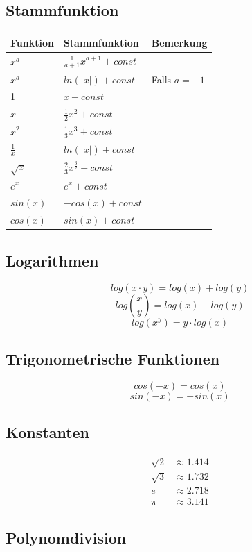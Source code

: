 \subsection{Stammfunktion}
\begin{tabu} to \linewidth {|X|X|X|}
	\hline
	Funktion 	& Stammfunktion & Bemerkung \\ 
	\hline\hline
	$x^a$ & $\frac{1}{a+1}x^{a+1} + const$ & \\ \hline
	$x^a$ & $ln(|x|) + const$ & Falls $a=-1$ \\  & $x + const$ & \\ \hline
	$x$ & $\frac{1}{2}x^2 + const$ & \\ \hline
	$x^2$ & $\frac{1}{3}x^3 + const$ & \\ \hline
	$\frac{1}{x}$ & $ln(|x|) + const$ & \\ \hline
	$\sqrt{x}$ & $\frac{2}{3}x^{\frac{3}{2}}+const$ & \\ \hline
	$e^x$ & $e^x + const$ & \\ \hline
	$sin(x)$ & $-cos(x) + const$ & \\ \hline
	$cos(x)$ & $sin(x) + const$ & \\ \hline
\end{tabu}

\subsection{Logarithmen}
\[
	log(x \cdot y) = log(x) + log(y)
\]
\[
	log(\frac{x}{y}) = log(x) - log(y)
\]
\[
	log(x^y) = y \cdot log(x)
\]

\subsection{Trigonometrische Funktionen}
\[
	cos(-x) = cos(x)
\]
\[
	sin(-x) = -sin(x)
\]

\subsection{Konstanten}
\begin{align*}
	\sqrt{2} &\approx 1.414 \\
	\sqrt{3} &\approx 1.732 \\
	e &\approx 2.718 \\
	\pi &\approx 3.141
\end{align*}

\subsection{Polynomdivision}
